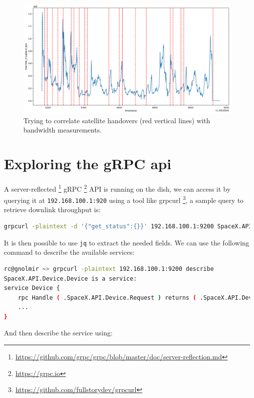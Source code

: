 \documentclass[IN,11pt,twoside,openright,bachelor,english]{tumthesis}
\begin{document}
\begin{figure}
	\centering
	\includegraphics[width=1\columnwidth]{img/correlation_handovers_bw.png}
	\caption{Trying to correlate satellite handovers (red vertical lines) with bandwidth measurements.}
	\label{fig:vis-correlation-handovers}
\end{figure}

\chapter{Exploring the gRPC api}

A server-reflected \footnote{\url{https://github.com/grpc/grpc/blob/master/doc/server-reflection.md}} gRPC
\footnote{\url{https://grpc.io}} API is running on the dish, we can access it by querying it at \texttt{192.168.100.1:920} using a tool like grpcurl \footnote{\url{https://github.com/fullstorydev/grpcurl}}, a sample query to retrieve downlink throughput is:

\begin{lstlisting}[language=bash,basicstyle=\tiny]
grpcurl -plaintext -d '{"get_status":{}}' 192.168.100.1:9200 SpaceX.API.Device.Device/Handle
\end{lstlisting}

It is then possible to use \texttt{jq} to extract the needed fields. We can use the following command to describe the available services:

\begin{lstlisting}[language=bash,basicstyle=\tiny]
rc@gnolmir ~> grpcurl -plaintext 192.168.100.1:9200 describe
SpaceX.API.Device.Device is a service:
service Device {
	rpc Handle ( .SpaceX.API.Device.Request ) returns ( .SpaceX.API.Device.Response );
	...
}
\end{lstlisting}

And then describe the service using:
\end{document}
